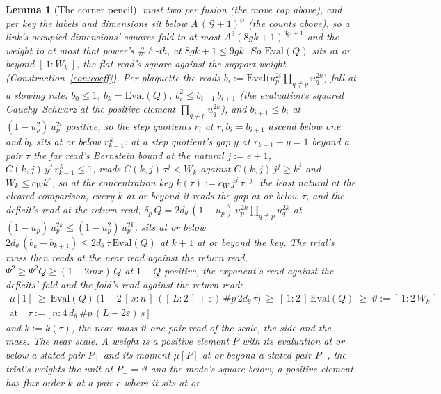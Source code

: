 \documentclass[11pt]{article}
\newtheorem{lemma}{Lemma}
\theoremstyle{definition}
\begin{document}
\begin{lemma}[The corner pencil]
most two per fusion (the move cap above), and per key the labels
and dimensions sit below $A\,(\mathcal G+1)^{\wp}$ (the counts above), so a
link's occupied dimensions' squares fold to at most
$A^{3}(8gk+1)^{3\wp+1}$ and the weight to at most that power's
$\#\ell$-th, at $8gk+1\le9gk$. So $\mathrm{Eval}(Q)$ sits at or
beyond $[\,1:W_k\,]$, the flat read's square against the support
weight (Construction~\ref{con:coeff}). Per plaquette the reads
$b_i:=\mathrm{Eval}\big(u_p^{2i}\prod_{q\ne p}u_q^{2k}\big)$ fall at
a slowing rate: $b_0\le1$, $b_k=\mathrm{Eval}(Q)$,
$b_i^{2}\le b_{i-1}\,b_{i+1}$ (the evaluation's squared
Cauchy--Schwarz at the positive element
$\prod_{q\ne p}u_q^{2k}$), and $b_{i+1}\le b_i$ at
$(1-u_p^{2})\,u_p^{2i}$ positive, so the \emph{step quotients} $r_i$
at $r_i\,b_i=b_{i+1}$ ascend below one and $b_k$ sits at or below
$r_{k-1}^{\,k}$: at a step quotient's gap $y$ at $r_{k-1}+y=1$
beyond a pair $\tau$ the far read's Bernstein bound at the natural
$j:=e+1$, $C(k,j)\,y^{j}\,r_{k-1}^{\,k}\le1$, reads
$C(k,j)\,\tau^{j}<W_k$ against $C(k,j)\,j^{j}\ge k^{j}$ and
$W_k\le c_Wk^{e}$, so at the \emph{concentration key}
$k(\tau):=c_W\,j^{j}\,\tau^{-j}$, the least natural at the cleared
comparison, every $k$ at or beyond it reads the gap at or below
$\tau$, and the deficit's read at the return read,
$\delta_p\,Q=2d_\theta\,(1-u_p)\,u_p^{2k}\prod_{q\ne p}u_q^{2k}$ at
$(1-u_p)\,u_p^{2k}\le(1-u_p^{2})\,u_p^{2k}$, sits at or below
$2d_\theta\,(b_k-b_{k+1})\le2d_\theta\,\tau\,\mathrm{Eval}(Q)$ at
$k+1$ at or beyond the key. The trial's mass then reads at the
near read against the return read, $\Psi^{2}\ge\Psi^{2}Q\ge(1-2mx)\,Q$
at $1-Q$ positive, the exponent's read against the deficits' fold
and the fold's read against the return read:
\begin{gather*}
\mu[1]\ \ge\ \mathrm{Eval}(Q)\,\Big(1-2\,[\,s:n\,]\,([\,L:2\,]+\varepsilon)\,
\#p\,2d_\theta\,\tau\Big)\ \ge\ [\,1:2\,]\,\mathrm{Eval}(Q)\ \ge\
\vartheta:=[\,1:2\,W_{k}\,]\\
\text{at}\quad
\tau:=\big[\,n:4\,d_\theta\,\#p\,(L+2\varepsilon)\,s\,\big]
\end{gather*}
and $k:=k(\tau)$, the \emph{near mass} $\vartheta$ one pair read
of the scale, the side and the mass.
\emph{The near scale.} A \emph{weight} is a positive element $P$
with its evaluation at or below a stated pair $P_+$ and its moment
$\mu[P]$ at or beyond a stated pair $P_-$, the trial's weights the
unit at $P_-=\vartheta$ and the mode's square below; a positive
element has \emph{flux order} $k$ at a pair $c$ where it sits at or

\end{lemma}
\end{document}
